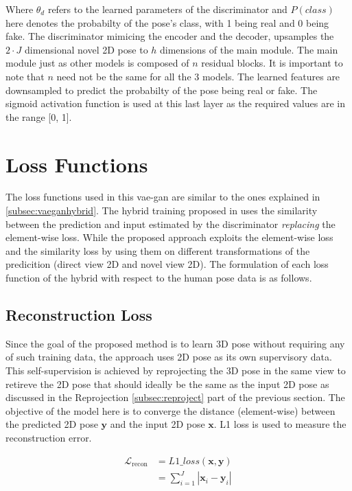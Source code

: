 Where $\theta_d$ refers to the learned parameters of the discriminator and $P(class)$ here denotes the probabilty of the pose's class, with 1 being real and 0 being fake. The discriminator mimicing the encoder and the decoder, upsamples the $2\!\cdot\!J$ dimensional novel 2D pose to $h$ dimensions of the main module. The main module just as other models is composed of $n$ residual blocks. It is important to note that $n$ need not be the same for all the 3 models. The learned features are downsampled to predict the probabilty of the pose being real or fake. The sigmoid activation function is used at this last layer as the required values are in the range [0, 1]. %

\section{Loss Functions}
\label{sec:loss_fn}
The loss functions used in this \ac{vae}-\ac{gan} are similar to the ones explained in \ref{subsec:vaeganhybrid}. The hybrid training proposed in \cite{autoencoding_beyond_pixels} uses the similarity between the prediction and input estimated by the discriminator \textit{replacing} the element-wise loss. While the proposed approach exploits the element-wise loss and the similarity loss by using them on different transformations of the predicition (direct view 2D and novel view 2D). The formulation of each loss function of the hybrid with respect to the human pose data is as follows.

\subsection{Reconstruction Loss}
Since the goal of the proposed method is to learn 3D pose without requiring any of such training data, the approach uses 2D pose as its own supervisory data. This self-supervision is achieved by reprojecting the 3D pose in the same view to retireve the 2D pose that should ideally be the same as the input 2D pose as discussed in the Reprojection \ref{subsec:reproject} part of the previous section. The objective of the model here is to converge the distance (element-wise) between the predicted 2D pose $\textbf{y}$ and the input 2D pose $\textbf{x}$. L1 loss is used to measure the reconstruction error.


\begin{equation} \label{loss_recon}
    \begin{split}  
        \mathcal{L}_{\text {recon}}  & = L1\_loss(\textbf{x}, \textbf{y}) \\
        & = \sum_{i=1}^J |\textbf{x}_i - \textbf{y}_i|
    \end{split}
\end{equation}

